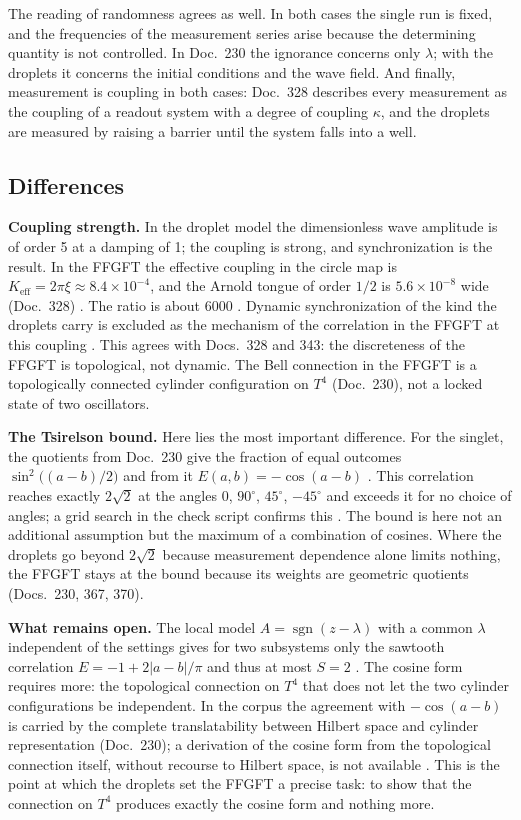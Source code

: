 The reading of randomness agrees as well. In both cases the single run is fixed, and the frequencies
of the measurement series arise because the determining quantity is not controlled. In Doc.~230 the
ignorance concerns only $\lambda$; with the droplets it concerns the initial conditions and the wave
field. And finally, measurement is coupling in both cases: Doc.~328 describes every measurement as
the coupling of a readout system with a degree of coupling $\kappa$, and the droplets are measured by
raising a barrier until the system falls into a well.

\subsection{Differences}

\textbf{Coupling strength.} In the droplet model the dimensionless wave amplitude is of order 5 at a
damping of 1; the coupling is strong, and synchronization is the result. In the FFGFT the effective
coupling in the circle map is $K_{\mathrm{eff}}=2\pi\xi\approx8.4\times10^{-4}$, and the Arnold tongue
of order $1/2$ is $5.6\times10^{-8}$ wide (Doc.~328) \KM. The ratio is about 6000 \KM. Dynamic
synchronization of the kind the droplets carry is excluded as the mechanism of the correlation in
the FFGFT at this coupling \XM. This agrees with Docs.~328 and 343: the discreteness of the FFGFT is
topological, not dynamic. The Bell connection in the FFGFT is a topologically connected cylinder
configuration on $T^4$ (Doc.~230), not a locked state of two oscillators.

\textbf{The Tsirelson bound.} Here lies the most important difference. For the singlet, the quotients
from Doc.~230 give the fraction of equal outcomes $\sin^2\!\big((a-b)/2\big)$ and from it
$E(a,b)=-\cos(a-b)$ \KM. This correlation reaches exactly $2\sqrt2$ at the angles $0$, $90^\circ$,
$45^\circ$, $-45^\circ$ and exceeds it for no choice of angles; a grid search in the check script
confirms this \KM. The bound is here not an additional assumption but the maximum of a combination
of cosines. Where the droplets go beyond $2\sqrt2$ because measurement dependence alone limits
nothing, the FFGFT stays at the bound because its weights are geometric quotients (Docs.~230, 367,
370).

\textbf{What remains open.} The local model $A=\operatorname{sgn}(z-\lambda)$ with a common $\lambda$
independent of the settings gives for two subsystems only the sawtooth correlation
$E=-1+2|a-b|/\pi$ and thus at most $S=2$ \KM. The cosine form requires more: the topological
connection on $T^4$ that does not let the two cylinder configurations be independent. In the corpus
the agreement with $-\cos(a-b)$ is carried by the complete translatability between Hilbert space and
cylinder representation (Doc.~230); a derivation of the cosine form from the topological connection
itself, without recourse to Hilbert space, is not available \SM. This is the point at which the
droplets set the FFGFT a precise task: to show that the connection on $T^4$ produces exactly the
cosine form and nothing more.

